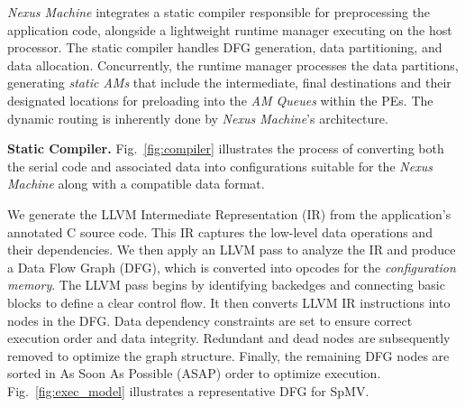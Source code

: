 {\textit{Nexus Machine} integrates a static compiler responsible for preprocessing the application code, alongside a lightweight runtime manager executing on the host processor. 
The static compiler handles DFG generation, data partitioning, and data allocation. 
Concurrently, the runtime manager processes the data partitions, generating \textit{static AMs} that include the intermediate, final destinations and their designated locations for preloading into the \textit{AM Queues} within the PEs.
The dynamic routing is inherently done by \textit{Nexus Machine}'s architecture.

\textbf{Static Compiler.}
Fig.~\ref{fig:compiler} illustrates the process of converting both the serial code and associated data into configurations suitable for the \textit{Nexus Machine} along with a compatible data format.

\begin{comment}
We generate the LLVM Intermediate Representation (IR) from the application's annotated C source code. 
This IR represents the low-level operations performed on data along with their dependencies.
We implement an LLVM pass to examine the LLVM IR and generate a DFG, which is translated into opcodes for the \textit{configuration memory}.
With the LLVM pass, first, backedges are identified and basic blocks are connected to establish a clear control flow. Transfer variables among nested loops are then identified, facilitating data movement across loop iterations. Subsequently, LLVM IR instructions are converted into nodes for the DFG. We then set data dependency constraints to ensure proper execution order and data integrity. Next, we remove redundant and dead DFG nodes to optimize the graph structure. Finally, the remaining DFG nodes are sorted by As Soon As Possible (ASAP) order to prioritize their execution. 
\end{comment}
We generate the LLVM Intermediate Representation (IR) from the application's annotated C source code. 
This IR captures the low-level data operations and their dependencies. 
We then apply an LLVM pass to analyze the IR and produce a Data Flow Graph (DFG), which is converted into opcodes for the \textit{configuration memory}.
The LLVM pass begins by identifying backedges and connecting basic blocks to define a clear control flow. 
It then converts LLVM IR instructions into nodes in the DFG. 
Data dependency constraints are set to ensure correct execution order and data integrity. 
Redundant and dead nodes are subsequently removed to optimize the graph structure. 
Finally, the remaining DFG nodes are sorted in As Soon As Possible (ASAP) order to optimize execution.
Fig.~\ref{fig:exec_model} illustrates a representative DFG for SpMV.

}
